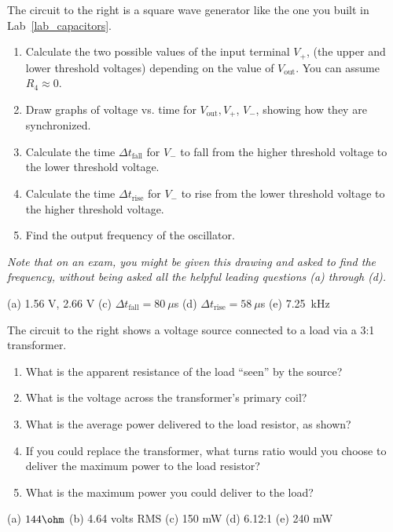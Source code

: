 \begin{Exercise}
The circuit to the right is a square wave generator like the one you built in Lab~\ref{lab_capacitors}.

 {
	\begin{enumerate}[label=(\alph*),wide]
	\item Calculate the two possible values of the input terminal $V_+$, (the upper and lower threshold voltages) depending on the value of $V_\text{out}$.  You can assume $R_4 \approx 0$. 
	\item Draw graphs of voltage vs. time for $V_\text{out}, V_+$,  $V_-$, showing how they are synchronized.  
	\item Calculate the time $\Delta t_\text{fall}$ for $V_-$ to fall from the higher threshold voltage to the lower threshold voltage.  
	\item Calculate the time $\Delta t_\text{rise}$ for $V_-$ to rise from the lower threshold voltage to the higher threshold voltage.  
	\item Find the output frequency of the oscillator.  
	\end{enumerate}
}

\medskip
\textit{Note that on an exam, you might be given this drawing and asked to find the frequency, without being asked all the helpful leading questions (a) through (d).}
\end{Exercise}
\begin{Answer}
(a) 1.56 V, 2.66 V (c) $\Delta t_\text{fall} = 80~\mu$s  (d) $\Delta t_\text{rise} = 58~\mu$s (e) 7.25~kHz
\end{Answer}

\begin{Exercise}
The circuit to the right shows a voltage source connected to a load via a 3:1 transformer. 


\vspace*{-0.15in}

 {
	\begin{enumerate}[label=(\alph*),nosep]
	\item What is the apparent resistance of the load ``seen'' by the source?
	\item What is the voltage across the transformer's primary coil?
	\item What is the average power delivered to the load resistor, as shown?
	\item If you could replace the transformer, what turns ratio would you choose to deliver the maximum power to the load resistor?
	\item What is the maximum power you could deliver to the load? 
	\end{enumerate}
}
\end{Exercise}
\begin{Answer}
(a) $144\ohm$ (b) 4.64 volts RMS (c) 150 mW (d) 6.12:1 (e) 240 mW 
\end{Answer}


